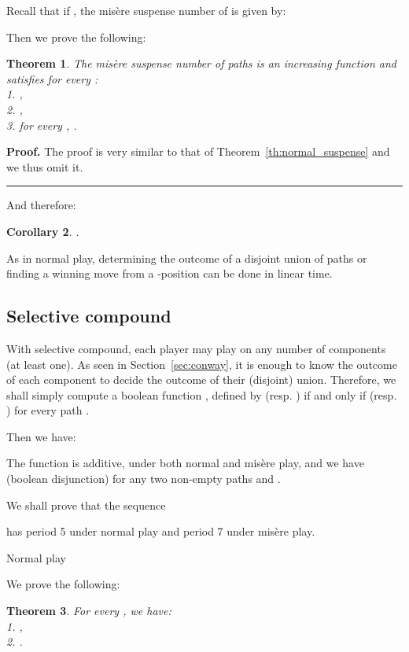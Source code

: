 \documentclass[11pt]{article}
\newcommand{\centre}[1]{\begin{center}#1\end{center}}
\newtheorem{theorem}{Theorem}
\newtheorem{corollary}[theorem]{Corollary}
\newcommand\qed{\mbox{}\hfill\rule{0.5em}{0.809em}\par\vskip 5mm}
\newenvironment{proof}[0]{\noindent\textbf{Proof.}}{\qed}
\begin{document}
\noindent
Recall that if , the mis\`ere suspense number 
of  is given by:


Then we prove the following:

\begin{theorem}
The mis\`ere suspense number  of paths is an increasing
function and satisfies for every :\\
1.  ,\\
2.  ,\\
3.   for every , .
\label{th:misere_suspense}
\end{theorem}

\begin{proof}
The proof is very similar to that of Theorem~\ref{th:normal_suspense} and we thus omit it.
\end{proof}

And therefore:

\begin{corollary}
.
\end {corollary}

As in normal play, determining the outcome of a disjoint union
of paths or finding a winning move from a -position can be done
in linear time.

\subsection{Selective compound}

With selective compound, each player may play on any number of components
(at least one). 
As seen in Section~\ref{sec:conway}, it is enough to know the outcome of each
component to decide the outcome of their (disjoint) union.
Therefore, we shall simply compute a boolean function , defined
by  (resp. ) if and only if 
(resp. ) for every path .

Then we have:



The function  is additive, under
both normal and mis\`ere play, and we
have  
(boolean disjunction) for any
two non-empty paths  and .

We shall prove that the sequence 

has period 5 under normal play and period 7 under mis\`ere play.

\vskip 4mm

\centre{{\sc Normal play}}

We prove the following:

\begin{theorem}
For every , we have:\\
1. ,\\
2. .
\label{th:selective-normal}
\end{theorem}
\end{document}
